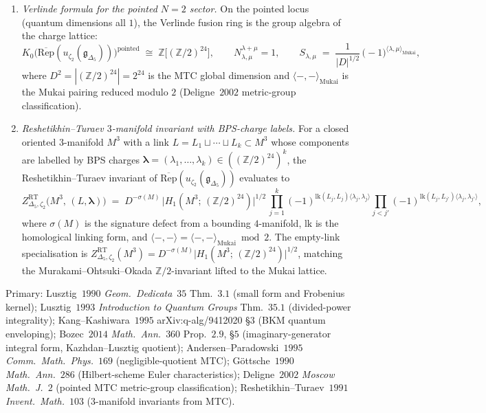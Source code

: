 \begin{conjecture}
\begin{enumerate}[label=\textup{(\roman*)}]
\item \emph{Verlinde formula for the pointed $N = 2$ sector.} On the
pointed locus (quantum dimensions all $1$), the Verlinde fusion ring
is the group algebra of the charge lattice:
\[
 K_0\bigl(\overline{\mathrm{Rep}}(u_{\zeta_2}(\mathfrak g_{\Delta_5}))
 \bigr)^{\mathrm{pointed}}
 \;\cong\;
 \mathbb Z\bigl[(\mathbb Z/2)^{24}\bigr],
 \qquad
 N^{\lambda + \mu}_{\lambda, \mu} = 1,
 \qquad
 S_{\lambda, \mu}
 \;=\;
 \frac{1}{|D|^{1/2}}\,
 \bigl(-1\bigr)^{\langle \lambda, \mu\rangle_{\mathrm{Mukai}}},
\]
where $D^2 = |(\mathbb Z/2)^{24}| = 2^{24}$ is the MTC global
dimension and $\langle-, -\rangle_{\mathrm{Mukai}}$ is the Mukai
pairing reduced modulo $2$
(Deligne~$2002$ metric-group classification).

\item \emph{Reshetikhin--Turaev $3$-manifold invariant with BPS-charge
labels.} For a closed oriented $3$-manifold $M^3$ with a link
$L = L_1 \sqcup \cdots \sqcup L_k \subset M^3$ whose components are
labelled by BPS charges
$\boldsymbol\lambda = (\lambda_1, \ldots, \lambda_k)
 \in ((\mathbb Z/2)^{24})^k$, the Reshetikhin--Turaev invariant of
$\overline{\mathrm{Rep}}(u_{\zeta_2}(\mathfrak g_{\Delta_5}))$ evaluates
to
\[
 Z^{\mathrm{RT}}_{\Delta_5, \zeta_2}\bigl(M^3,\, (L, \boldsymbol\lambda)\bigr)
 \;=\;
 D^{-\sigma(M)}\,
 \bigl|H_1(M^3;\,(\mathbb Z/2)^{24})\bigr|^{1/2}\,
 \prod_{j = 1}^{k}
 (-1)^{\mathrm{lk}(L_j, L_j)\langle\lambda_j, \lambda_j\rangle}
 \prod_{j < j'}
 (-1)^{\mathrm{lk}(L_j, L_{j'})\langle\lambda_j, \lambda_{j'}\rangle},
\]
where $\sigma(M)$ is the signature defect from a bounding $4$-manifold,
$\mathrm{lk}$ is the homological linking form, and
$\langle -, -\rangle = \langle -, -\rangle_{\mathrm{Mukai}} \bmod 2$.
The empty-link specialisation is
$Z^{\mathrm{RT}}_{\Delta_5, \zeta_2}(M^3) =
 D^{-\sigma(M)}\bigl|H_1(M^3;\,(\mathbb Z/2)^{24})\bigr|^{1/2}$,
matching the Murakami--Ohtsuki--Okada $\mathbb Z/2$-invariant lifted
to the Mukai lattice.
\end{enumerate}
Primary: Lusztig~$1990$ \emph{Geom.~Dedicata}~$35$ Thm.~$3.1$
(small form and Frobenius kernel);
Lusztig~$1993$ \emph{Introduction to Quantum Groups} Thm.~$35.1$
(divided-power integrality);
Kang--Kashiwara~$1995$ arXiv:q-alg/9412020 \S$3$
(BKM quantum enveloping);
Bozec~$2014$ \emph{Math.~Ann.}~$360$ Prop.~$2.9$, \S$5$
(imaginary-generator integral form, Kazhdan--Lusztig quotient);
Andersen--Paradowski~$1995$ \emph{Comm.~Math.~Phys.}~$169$
(negligible-quotient MTC);
G\"ottsche~$1990$ \emph{Math.~Ann.}~$286$ (Hilbert-scheme Euler
characteristics);
Deligne~$2002$ \emph{Moscow Math.~J.}~$2$ (pointed MTC metric-group
classification);
Reshetikhin--Turaev~$1991$ \emph{Invent.~Math.}~$103$
($3$-manifold invariants from MTC).
\end{conjecture}

